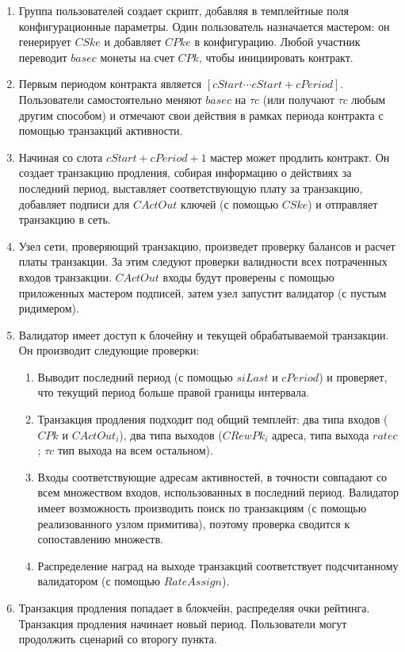 \documentclass[specification,annotation]{itmo-student-thesis}
\begin{document}
\begin{enumerate}
\item Группа пользователей создает скрипт, добавляя в темплейтные поля
  конфигурационные параметры. Один пользователь назначается мастером:
  он генерирует $CSke$ и добавляет $CPke$ в конфигурацию. Любой
  участник переводит $basec$ монеты на счет $CPk$, чтобы инициировать
  контракт.
\item Первым периодом контракта является $[cStart \cdots
  cStart+cPeriod]$. Пользователи самостоятельно меняют $basec$ на
  $\tau c$ (или получают $\tau c$ любым другим способом) и отмечают
  свои действия в рамках периода контракта с помощью транзакций
  активности.
\item Начиная со слота $cStart + cPeriod + 1$ мастер может продлить
  контракт. Он создает транзакцию продления, собирая информацию о
  действиях за последний период, выставляет соответствующую плату за
  транзакцию, добавляет подписи для $CActOut$ ключей (с помощью
  $CSke$) и отправляет транзакцию в сеть.
\item Узел сети, проверяющий транзакцию, произведет проверку балансов
  и расчет платы транзакции. За этим следуют проверки валидности всех
  потраченных входов транзакции. $CActOut$ входы будут проверены с
  помощью приложенных мастером подписей, затем узел запустит валидатор
  (с пустым ридимером).
\item Валидатор имеет доступ к блочейну и текущей обрабатываемой
  транзакции. Он производит следующие проверки:
  \begin{enumerate}
  \item Выводит последний период (с помощью $siLast$ и $cPeriod$) и
    проверяет, что текущий период больше правой границы интервала.
  \item Транзакция продления подходит под общий темплейт: два типа
    входов ($CPk$ и $CActOut_i$), два типа выходов ($CRewPk_i$ адреса,
    типа выхода $ratec$; $\tau c$ тип выхода на всем остальном).
  \item Входы соответствующие адресам активностей, в точности
    совпадают со всем множеством входов, использованных в последний
    период. Валидатор имеет возможность производить поиск по
    транзакциям (с помощью реализованного узлом примитива), поэтому
    проверка сводится к сопоставлению множеств.
  \item Распределение наград на выходе транзакций соответствует
    подсчитанному валидатором (с помощью $RateAssign$).
  \end{enumerate}
\item Транзакция продления попадает в блокчейн, распределяя очки
  рейтинга. Транзакция продления начинает новый период. Пользователи
  могут продолжить сценарий со второгу пункта.
\end{enumerate}
\end{document}
